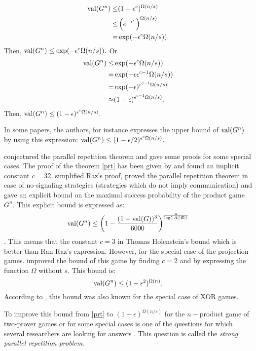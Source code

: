 \begin{align*}
\mathrm{val} (G^n) \leq & (1-\epsilon^c)^{\Omega(n/s)} \\ \leq &  \left(e^{-\epsilon^c}\right)^{\Omega(n/s)} \\ = & \exp (-\epsilon^c \Omega(n/s)).
\end{align*}
 Then, $\mathrm{val} (G^n) \leq \exp (-\epsilon^c \Omega(n/s)).$
Or 
\begin{align*}
\mathrm{val} (G^n) \leq & \exp (-\epsilon^c \Omega(n/s))  \\ = & \exp (-\epsilon \epsilon^{c-1} \Omega(n/s)) \\= & \exp (-\epsilon)^{\epsilon^{c-1} \Omega(n/s)} \\ \approx &  (1-\epsilon)^{\epsilon^{c-1} \Omega(n/s)}.
\end{align*} 
Then, $\mathrm{val} (G^n) \leq (1-\epsilon)^{\epsilon^{c} \Omega(n/s)}.$

In some papers, the authors, for instance \cite{rao2011parallel} expresses the upper bound of $\mathrm{val} (G^n)$ by using this expression: $\mathrm{val} (G^n) \leq (1-{\epsilon}/{2})^{  \epsilon^{c} \Omega(n/s)}.$

\cite{feige1992two} conjectured the parallel repetition theorem and gave some proofs for some special cases. The proof of the theorem \eqref{prt}  has been given by \cite{raz1998parallel} and found an implicit constant   $c=32$.  \cite{holenstein2007parallel} simplified Raz's proof, proved the parallel repetition theorem in case of no-signaling strategies (strategies which do
not imply communication) and gave an explicit bound on the maximal success probability of the product game $G^n.$ This explicit bound is expressed as:
$$\mathrm{val} (G^n) \leq \left(1-\frac{(1-\mathrm{val} (G))^3}{6000} \right)^{\frac{n}{\log (|A||B|)}}$$. This means that the constant $c=3$ in Thomas Holenstein's bound which is better than Ran Raz's expression. However, for the special case of the projection games. 
\cite{rao2011parallel} improved the bound of this game by finding $c=2$ and by expressing the function $\Omega$ without $s.$ This bound is: $$\mathrm{val} (G^n) \leq (1-\epsilon^2)^{\Omega(n)}.$$ According to \cite{raz2010parallel}, this bound was also known for the special case of XOR games.

To improve this bound from \eqref{prt} to $(1-\epsilon)^{\Omega(n/s)}$ for the $n-$product game of two-prover games or for some special cases  is one of the questions for which several researchers are looking for answers \citep{raz2010parallel}.  This question is called the \textit{strong parallel repetition problem}.


